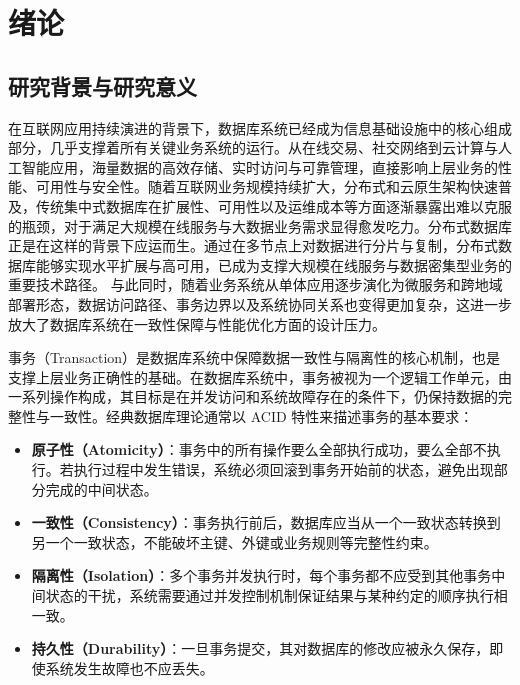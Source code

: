 \chapter{绪论}

\section{研究背景与研究意义}

在互联网应用持续演进的背景下，数据库系统已经成为信息基础设施中的核心组成部分，几乎支撑着所有关键业务系统的运行\cite{Chen2025NextDBMS,WangShan2014Database}。从在线交易、社交网络到云计算与人工智能应用，海量数据的高效存储、实时访问与可靠管理，直接影响上层业务的性能、可用性与安全性\cite{Cattell2011, Stonebraker2010}。随着互联网业务规模持续扩大，分布式和云原生架构快速普及，传统集中式数据库在扩展性、可用性以及运维成本等方面逐渐暴露出难以克服的瓶颈，对于满足大规模在线服务与大数据业务需求显得愈发吃力\cite{Agrawal2016,CuiBin2019DataManagement}。分布式数据库正是在这样的背景下应运而生。通过在多节点上对数据进行分片与复制，分布式数据库能够实现水平扩展与高可用，已成为支撑大规模在线服务与数据密集型业务的重要技术路径\cite{Ozsu2011}。
与此同时，随着业务系统从单体应用逐步演化为微服务和跨地域部署形态，数据访问路径、事务边界以及系统协同关系也变得更加复杂\cite{dragoni2017microservices,corbett2013spanner}，这进一步放大了数据库系统在一致性保障与性能优化方面的设计压力。

事务（Transaction）是数据库系统中保障数据一致性与隔离性的核心机制，也是支撑上层业务正确性的基础\cite{Gray1993,WangShan2014Database}。在数据库系统中，事务被视为一个逻辑工作单元，由一系列操作构成，其目标是在并发访问和系统故障存在的条件下，仍保持数据的完整性与一致性。经典数据库理论通常以 ACID 特性来描述事务的基本要求\cite{berenson1995critique,Haerder1983}：
\begin{itemize}
      \item \textbf{原子性（Atomicity）}：事务中的所有操作要么全部执行成功，要么全部不执行。若执行过程中发生错误，系统必须回滚到事务开始前的状态，避免出现部分完成的中间状态。
      \item \textbf{一致性（Consistency）}：事务执行前后，数据库应当从一个一致状态转换到另一个一致状态，不能破坏主键、外键或业务规则等完整性约束。
      \item \textbf{隔离性（Isolation）}：多个事务并发执行时，每个事务都不应受到其他事务中间状态的干扰，系统需要通过并发控制机制保证结果与某种约定的顺序执行相一致。
      \item \textbf{持久性（Durability）}：一旦事务提交，其对数据库的修改应被永久保存，即使系统发生故障也不应丢失。
\end{itemize}

